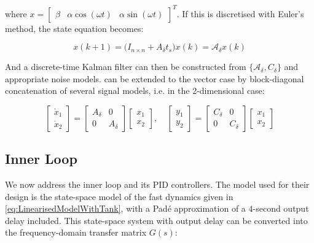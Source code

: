 where $x = \begin{bmatrix}\beta & \alpha \cos(\omega t) & \alpha \sin(\omega t)\end{bmatrix}^T$. If this is discretised with Euler's method, the state equation becomes:

\begin{equation}\label{eq:TheisticDisturbanceEstimatorDiscrete}
	x(k+1) = \Big(I_{n\times n} + A_\delta t_s \Big) x(k) = \mathcal{A}_\delta x(k)
\end{equation}

And a discrete-time Kalman filter can then be constructed from $\{\mathcal{A}_\delta,C_\delta\}$ and appropriate noise models.  can be extended to the vector case by block-diagonal concatenation of several signal models, i.e. in the 2-dimensional case:

\begin{equation}\label{eq:DisturbanceVectorCase}
		\begin{bmatrix}\dot{x}_1 \\ \dot{x}_2 \end{bmatrix} = \begin{bmatrix}A_\delta & 0 \\ 0 & A_\delta \end{bmatrix} \begin{bmatrix} x_1 \\ x_2 \end{bmatrix},
		 \quad \begin{bmatrix}y_1 \\ y_2 \end{bmatrix} = \begin{bmatrix}C_\delta & 0 \\ 0 & C_\delta \end{bmatrix} \begin{bmatrix} x_1 \\ x_2 \end{bmatrix}
\end{equation}


\subsection{Inner Loop}\label{subsec:InnerLoop}

We now address the inner loop and its PID controllers. The model used for their design is the state-space model of the fast dynamics given in \cref{eq:LinearisedModelWithTank}, with a Padé approximation of a $4$-second output delay included. This state-space system with output delay can be converted into the frequency-domain transfer matrix $G(s)$:


